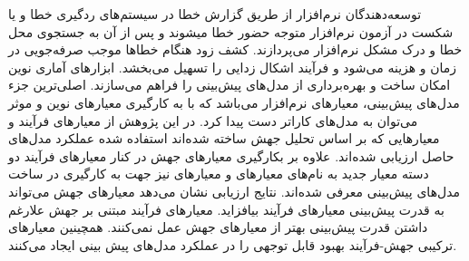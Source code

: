 
 توسعه‌دهندگان نرم‌افزار از طریق گزارش خطا در سیستم­‌های ردگیری خطا و یا شکست در آزمون نرم‌‌افزار متوجه حضور خطا می­شوند و پس از آن به جستجوی محل خطا و درک مشکل  نرم‌‌افزار می‌‌پردازند. کشف زود هنگام خطاها موجب صرفه‌‌جویی در زمان و هزینه می­‌شود و فرآیند اشکال زدایی را تسهیل می‌­بخشد. ابزارهای آماری نوین امکان ساخت و بهره‌‌برداری از مدل‌های پیش‌بینی را فراهم می‌سازند. اصلی‌ترین جزء مدل‌های پیش‌بینی، معیارهای نرم‌افزار می‌باشد که با به کارگیری معیارهای نوین و موثر می‌توان به مدل‌های کاراتر دست پیدا کرد. در این پژوهش از معیارهای فرآیند و معیارهایی که بر اساس تحلیل جهش ساخته شده‌اند استفاده شده عملکرد مدل‌های حاصل ارزیابی شده‌اند. علاوه بر بکارگیری معیارهای جهش در کنار معیارهای فرآیند دو دسته معیار جدید به نام‌های معیارهای  و معیارهای  نیز جهت به کارگیری در ساخت مدل‌های پیش‌بینی معرفی شده‌اند. نتایج ارزیابی نشان می‌دهد معیارهای جهش می‌تواند به قدرت پیش‌بینی معیارهای فرآیند بیافزاید. معیارهای فرآیند مبتنی بر جهش علارغم داشتن قدرت پیش‌بینی بهتر از معیارهای جهش عمل نمی‌کنند. همچینین معیارهای ترکیبی جهش-فرآیند بهبود قابل توجهی را در عملکرد مدل‌های پیش بینی ایجاد می‌کنند. 
